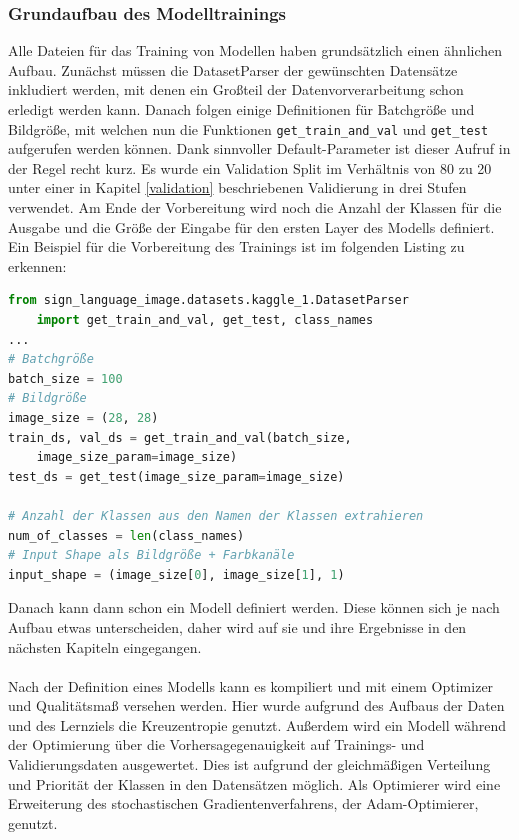 \documentclass[11pt,bibliography=totocnumbered]{scrartcl}
\begin{document}
\subsubsection{Grundaufbau des Modelltrainings}
Alle Dateien für das Training von Modellen haben grundsätzlich einen ähnlichen Aufbau. Zunächst müssen die DatasetParser der gewünschten Datensätze inkludiert werden, mit denen ein Großteil der Datenvorverarbeitung schon erledigt werden kann. Danach folgen einige Definitionen für Batchgröße und Bildgröße, mit welchen nun die Funktionen \lstinline[language=pythoninline]|get_train_and_val| und \lstinline[language=pythoninline]|get_test| aufgerufen werden können. Dank sinnvoller Default-Parameter ist dieser Aufruf in der Regel recht kurz. Es wurde ein Validation Split im Verhältnis von 80 zu 20 unter einer in Kapitel \ref{validation} beschriebenen Validierung in drei Stufen verwendet. Am Ende der Vorbereitung wird noch die Anzahl der Klassen für die Ausgabe und die Größe der Eingabe für den ersten Layer des Modells definiert. Ein Beispiel für die Vorbereitung des Trainings ist im folgenden Listing zu erkennen:
\begin{lstlisting}[language=python,firstnumber=1,caption={Beispielhafte Vorbereitung für das Training},label=lst:pre_train]
from sign_language_image.datasets.kaggle_1.DatasetParser
	import get_train_and_val, get_test, class_names 
...
# Batchgröße
batch_size = 100
# Bildgröße
image_size = (28, 28)
train_ds, val_ds = get_train_and_val(batch_size, 
	image_size_param=image_size)
test_ds = get_test(image_size_param=image_size)

# Anzahl der Klassen aus den Namen der Klassen extrahieren
num_of_classes = len(class_names)
# Input Shape als Bildgröße + Farbkanäle
input_shape = (image_size[0], image_size[1], 1)
\end{lstlisting}
Danach kann dann schon ein Modell definiert werden. Diese können sich je nach Aufbau etwas unterscheiden, daher wird auf sie und ihre Ergebnisse in den nächsten Kapiteln eingegangen.
\\\\
Nach der Definition eines Modells kann es kompiliert und mit einem Optimizer und Qualitätsmaß versehen werden. Hier wurde aufgrund des Aufbaus der Daten und des Lernziels die Kreuzentropie genutzt. Außerdem wird ein Modell während der Optimierung über die Vorhersagegenauigkeit auf Trainings- und Validierungsdaten ausgewertet. Dies ist aufgrund der gleichmäßigen Verteilung und Priorität der Klassen in den Datensätzen möglich. Als Optimierer wird eine Erweiterung des stochastischen Gradientenverfahrens, der Adam-Optimierer, genutzt.
\end{document}
